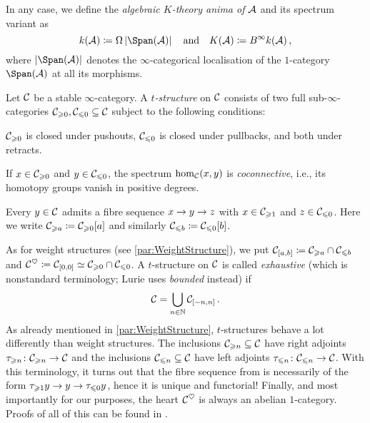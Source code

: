 \documentclass[a4paper, 10pt, oneside, DIV=9, chapterprefix=true, numbers=enddot,bibliography=totoc]{scrbook}
\begin{document}
In any case, we define the \emph{algebraic $K$-theory anima of $\mathcal{A}$} and its spectrum variant as
\begin{equation*}
	k(\Aa)\coloneqq \Omega \left|\Span(\Aa)\right|\quad\text{and}\quad K(\Aa)\coloneqq B^\infty k(\Aa)\,,
\end{equation*}
where $\left|\Span(\Aa)\right|$ denotes the $\infty$-categorical localisation of the $1$-category $\Span(\Aa)$ at all its morphisms.



\label{par:tStructure}
Let $\mathcal{C}$ be a stable $\infty$-category. A \emph{$t$-structure} on $\mathcal{C}$ consists of two full sub-$\infty$-categories $\mathcal{C}_{\geqslant 0},\mathcal{C}_{\leqslant 0}\subseteq \mathcal{C}$ subject to the following conditions:
\begin{alphanumerate}
	\item $\mathcal{C}_{\geqslant 0}$ is closed under pushouts, $\mathcal{C}_{\leqslant 0}$ is closed under pullbacks, and both under retracts.
	\item If $x\in \mathcal{C}_{\geqslant 0}$ and $y\in \mathcal{C}_{\leqslant 0}$, the spectrum $\hom_{\mathcal{C}}(x,y)$ is \emph{coconnective}, i.e., its homotopy groups vanish in positive degrees.
	\item Every $y\in \mathcal{C}$ admits a fibre sequence $x\morphism y \morphism z$ with $x\in \mathcal{C}_{\geqslant 1}$ and $z\in \mathcal{C}_{\leqslant 0}$. Here we write $\mathcal{C}_{\geqslant a}\coloneqq \mathcal{C}_{\geqslant 0}[a]$ and similarly $\mathcal{C}_{\leqslant b}\coloneqq \mathcal{C}_{\leqslant 0}[b]$.
\end{alphanumerate}
As for weight structures (see \cref{par:WeightStructure}), we put $\mathcal{C}_{[a,b]}\coloneqq \mathcal{C}_{\geqslant a}\cap \mathcal{C}_{\leqslant b}$ and $\mathcal{C}^\heartsuit\coloneqq \mathcal{C}_{[0,0]}\simeq \mathcal{C}_{\geqslant 0}\cap \mathcal{C}_{\leqslant 0}$. A $t$-structure on $\mathcal{C}$ is called \emph{exhaustive} (which is nonstandard terminology; Lurie uses \emph{bounded} instead) if
\begin{equation*}
	\mathcal{C}=\bigcup_{n\in\mathbb{N}}\mathcal{C}_{[-n,n]}\,.
\end{equation*}
As already mentioned in \cref{par:WeightStructure}, $t$-structures behave a lot differently than weight structures. The inclusions $\mathcal{C}_{\geqslant n}\subseteq \mathcal{C}$ have right adjoints $\tau_{\geq n}\colon \Cc_{\geq n}\morphism \Cc$ and the inclusions $\mathcal{C}_{\leqslant n}\subseteq \mathcal{C}$ have left adjoints $\tau_{\leq n}\colon \Cc_{\leq n}\morphism \Cc$. With this terminology, it turns out that the fibre sequence from  is necessarily of the form $\tau_{\geq 1} y \morphism y \morphism \tau_{\leq 0}y$, hence it is unique and functorial! Finally, and most importantly for our purposes, the heart $\mathcal{C}^\heartsuit$ is always an abelian $1$-category. Proofs of all of this can be found in \cite[Subsection~1.2.1]{HA}.
\end{document}
